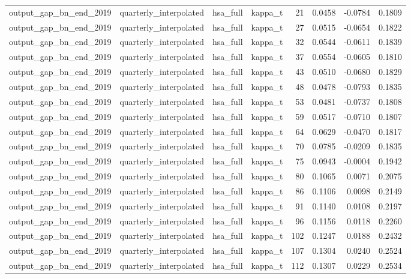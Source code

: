 \begin{tabular}{llllrrrr}
output\_gap\_bn\_end\_2019 & quarterly\_interpolated & hsa\_full & kappa\_t & 21 & 0.0458 & -0.0784 & 0.1809 \\
output\_gap\_bn\_end\_2019 & quarterly\_interpolated & hsa\_full & kappa\_t & 27 & 0.0515 & -0.0654 & 0.1822 \\
output\_gap\_bn\_end\_2019 & quarterly\_interpolated & hsa\_full & kappa\_t & 32 & 0.0544 & -0.0611 & 0.1839 \\
output\_gap\_bn\_end\_2019 & quarterly\_interpolated & hsa\_full & kappa\_t & 37 & 0.0554 & -0.0605 & 0.1810 \\
output\_gap\_bn\_end\_2019 & quarterly\_interpolated & hsa\_full & kappa\_t & 43 & 0.0510 & -0.0680 & 0.1829 \\
output\_gap\_bn\_end\_2019 & quarterly\_interpolated & hsa\_full & kappa\_t & 48 & 0.0478 & -0.0793 & 0.1835 \\
output\_gap\_bn\_end\_2019 & quarterly\_interpolated & hsa\_full & kappa\_t & 53 & 0.0481 & -0.0737 & 0.1808 \\
output\_gap\_bn\_end\_2019 & quarterly\_interpolated & hsa\_full & kappa\_t & 59 & 0.0517 & -0.0710 & 0.1807 \\
output\_gap\_bn\_end\_2019 & quarterly\_interpolated & hsa\_full & kappa\_t & 64 & 0.0629 & -0.0470 & 0.1817 \\
output\_gap\_bn\_end\_2019 & quarterly\_interpolated & hsa\_full & kappa\_t & 70 & 0.0785 & -0.0209 & 0.1835 \\
output\_gap\_bn\_end\_2019 & quarterly\_interpolated & hsa\_full & kappa\_t & 75 & 0.0943 & -0.0004 & 0.1942 \\
output\_gap\_bn\_end\_2019 & quarterly\_interpolated & hsa\_full & kappa\_t & 80 & 0.1065 & 0.0071 & 0.2075 \\
output\_gap\_bn\_end\_2019 & quarterly\_interpolated & hsa\_full & kappa\_t & 86 & 0.1106 & 0.0098 & 0.2149 \\
output\_gap\_bn\_end\_2019 & quarterly\_interpolated & hsa\_full & kappa\_t & 91 & 0.1140 & 0.0108 & 0.2197 \\
output\_gap\_bn\_end\_2019 & quarterly\_interpolated & hsa\_full & kappa\_t & 96 & 0.1156 & 0.0118 & 0.2260 \\
output\_gap\_bn\_end\_2019 & quarterly\_interpolated & hsa\_full & kappa\_t & 102 & 0.1247 & 0.0188 & 0.2432 \\
output\_gap\_bn\_end\_2019 & quarterly\_interpolated & hsa\_full & kappa\_t & 107 & 0.1304 & 0.0240 & 0.2524 \\
output\_gap\_bn\_end\_2019 & quarterly\_interpolated & hsa\_full & kappa\_t & 112 & 0.1307 & 0.0229 & 0.2534 \\

\end{tabular}
